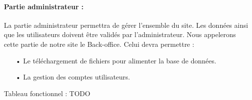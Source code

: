 \paragraph{Partie administrateur :} La partie administrateur permettra de gérer l'ensemble du site. Les données ainsi que les utilisateurs doivent être validés par l'administrateur. Nous appelerons cette partie de notre site le Back-office. Celui devra permettre :
\begin{enumerate}
\item[•] Le téléchargement de fichiers pour alimenter la base de données.
\item[•] La gestion des comptes utilisateurs.
\end{enumerate}
\clearpage

Tableau fonctionnel : TODO